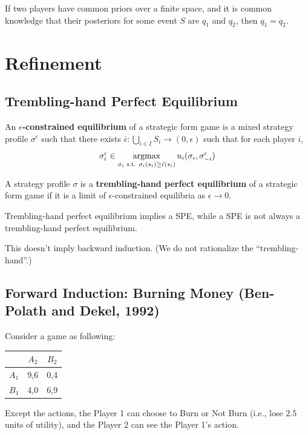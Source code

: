 \documentclass[11pt]{elegantbook_2}
\newcommand{\argmax}{\operatornamewithlimits{argmax}}
\begin{document}
\begin{corollary}
    If two players have common priors over a finite space, and it is common knowledge that their posteriors for some event $S$ are $q_1$ and $q_2$, then $q_1 = q_2$.
\end{corollary}



\section{Refinement}
\subsection{Trembling-hand Perfect Equilibrium}
\begin{definition}
    An \textbf{$\epsilon$-constrained equilibrium} of a strategic form game is a mixed strategy profile $\sigma^\epsilon$ such that there exists $\bar{\epsilon}: \bigcup_{i \in I} S_i \rightarrow(0, \epsilon)$ such that for each player $i$,
    \begin{equation}
        \begin{aligned}
            \sigma^\epsilon_i\in\argmax_{\sigma_i \textnormal{ s.t. }\sigma_i(s_i)\geq \bar{\epsilon}(s_i)} u_i(\sigma_i,\sigma^\epsilon_{-i})
        \end{aligned}
        \nonumber
    \end{equation}
\end{definition}


\begin{definition}
    A strategy profile $\sigma$ is a \textbf{trembling-hand perfect equilibrium} of a strategic form game if it is a limit of $\epsilon$-constrained equilibria as $\epsilon \rightarrow 0$.
\end{definition}

\begin{note}
    Trembling-hand perfect equilibrium implies a SPE, while a SPE is not always a trembling-hand perfect equilibrium.
\end{note}

This doesn't imply backward induction. (We do not rationalize the ``trembling-hand''.)


\subsection{Forward Induction: Burning Money (Ben-Polath and Dekel, 1992)}
Consider a game as following:
\begin{center}
    \begin{tabular}{ccc}
        \hline
            &$A_2$ &$B_2$\\
        \hline
            $A_1$& 9,6 & 0,4\\
            $B_1$& 4,0 & 6,9\\
        \hline
    \end{tabular}
\end{center}
Except the actions, the Player 1 can choose to Burn or Not Burn (i.e., lose $2.5$ units of utility), and the Player 2 can see the Player 1's action.
\end{document}
